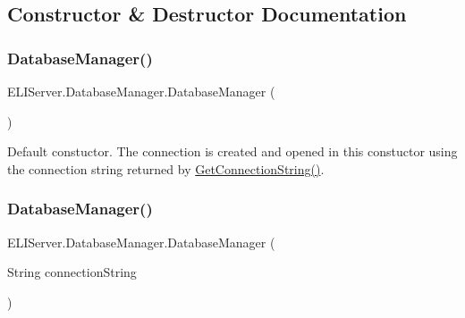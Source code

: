 \subsection{Constructor \& Destructor Documentation}
\mbox{\label{class_e_l_i_server_1_1_database_manager_af4932c44cd155cec929be0207f17605e}} 
\subsubsection{\texorpdfstring{Database\+Manager()}{DatabaseManager()}\hspace{0.1cm}{\footnotesize\ttfamily [1/2]}}
{\footnotesize\ttfamily E\+L\+I\+Server.\+Database\+Manager.\+Database\+Manager (\begin{DoxyParamCaption}{ }\end{DoxyParamCaption})\hspace{0.3cm}{\ttfamily [inline]}}



Default constuctor. The connection is created and opened in this constuctor using the connection string returned by \hyperlink{class_e_l_i_server_1_1_database_manager_a2a2f09721d3e5ea9db778d74e517e8da}{Get\+Connection\+String()}. 

\mbox{\label{class_e_l_i_server_1_1_database_manager_a194f6838e3c20bc118069a33a7b3465b}} 
\subsubsection{\texorpdfstring{Database\+Manager()}{DatabaseManager()}\hspace{0.1cm}{\footnotesize\ttfamily [2/2]}}
{\footnotesize\ttfamily E\+L\+I\+Server.\+Database\+Manager.\+Database\+Manager (\begin{DoxyParamCaption}\item[{String}]{connection\+String }\end{DoxyParamCaption})\hspace{0.3cm}{\ttfamily [inline]}}




